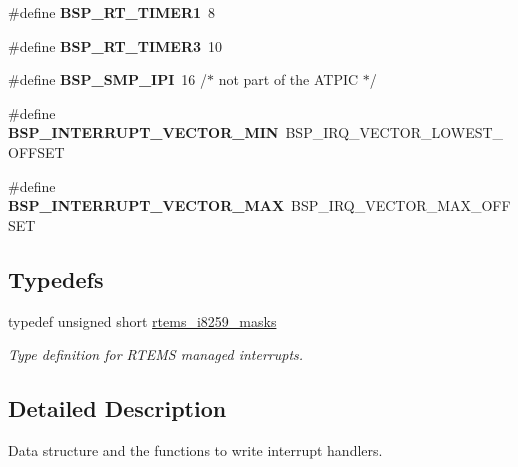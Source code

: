 \begin{DoxyCompactItemize}
\item 
\mbox{\label{group__i386__irq_ga8d8776b928d65277dce2e39000917860}} 
\#define {\bfseries B\+S\+P\+\_\+\+R\+T\+\_\+\+T\+I\+M\+E\+R1}~8
\item 
\mbox{\label{group__i386__irq_ga73e64da8ddf7411307e2e412b611816c}} 
\#define {\bfseries B\+S\+P\+\_\+\+R\+T\+\_\+\+T\+I\+M\+E\+R3}~10
\item 
\mbox{\label{group__i386__irq_gacfc7410ade5d5d938a09412347219bff}} 
\#define {\bfseries B\+S\+P\+\_\+\+S\+M\+P\+\_\+\+I\+PI}~16 /$\ast$ not part of the A\+T\+P\+IC $\ast$/
\item 
\mbox{\label{group__i386__irq_ga64cbb02dfea4d6923abccaa0087d2a0d}} 
\#define {\bfseries B\+S\+P\+\_\+\+I\+N\+T\+E\+R\+R\+U\+P\+T\+\_\+\+V\+E\+C\+T\+O\+R\+\_\+\+M\+IN}~B\+S\+P\+\_\+\+I\+R\+Q\+\_\+\+V\+E\+C\+T\+O\+R\+\_\+\+L\+O\+W\+E\+S\+T\+\_\+\+O\+F\+F\+S\+ET
\item 
\mbox{\label{group__i386__irq_gae4a2cdda5816a4c83c2fac0a49880c6e}} 
\#define {\bfseries B\+S\+P\+\_\+\+I\+N\+T\+E\+R\+R\+U\+P\+T\+\_\+\+V\+E\+C\+T\+O\+R\+\_\+\+M\+AX}~B\+S\+P\+\_\+\+I\+R\+Q\+\_\+\+V\+E\+C\+T\+O\+R\+\_\+\+M\+A\+X\+\_\+\+O\+F\+F\+S\+ET
\end{DoxyCompactItemize}
\subsection*{Typedefs}
\begin{DoxyCompactItemize}
\item 
\mbox{\label{group__i386__irq_gabcb5f2200fea51d658c5ed728282ee77}} 
typedef unsigned short \mbox{\hyperlink{group__i386__irq_gabcb5f2200fea51d658c5ed728282ee77}{rtems\+\_\+i8259\+\_\+masks}}
\begin{DoxyCompactList}\small\item\em Type definition for R\+T\+E\+MS managed interrupts. \end{DoxyCompactList}\end{DoxyCompactItemize}


\subsection{Detailed Description}
Data structure and the functions to write interrupt handlers. 

